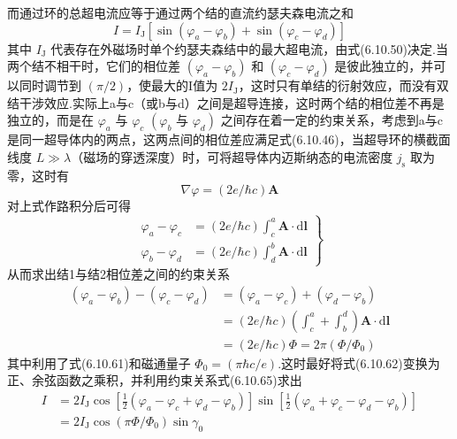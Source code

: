 而通过环的总超电流应等于通过两个结的直流约瑟夫森电流之和
\begin{equation}
  I=I_{\mathrm{J}}\left[\sin\left(\varphi_{a}-\varphi_{b}\right)
  +\sin\left(\varphi_{c}-\varphi_{d}\right)\right]
\end{equation}
其中 $I_{\mathrm{J}}$ 代表存在外磁场时单个约瑟夫森结中的最大超电流，由式(6.10.50)决定.当两个结不相干时，它们的相位差 $\left(\varphi_{a}-\varphi_{b}\right)$ 和
$\left(\varphi_{c}-\varphi_{d}\right)$ 是彼此独立的，并可以同时调节到 $\left(\pi/2\right)$，使最大的I值为 $2I_{\mathrm{J}}$，这时只有单结的衍射效应，而没有双结干涉效应.实际上a与c（或b与d）之间是超导连接，这时两个结的相位差不再是独立的，而是在 $\varphi_{a}$ 与 $\varphi_{c}$ $\left(\varphi_{b}\right.$ 与 $\left.\varphi_{d}\right)$ 之间存在着一定的约束关系，考虑到a与c是同一超导体内的两点，这两点间的相位差应满足式(6.10.46)，当超导环的横截面线度 $L\gg\lambda$（磁场的穿透深度）时，可将超导体内迈斯纳态的电流密度 $j_{\mathrm{s}}$ 取为零，这时有
\begin{equation}
  \nabla\varphi=\left(2e/\hbar c\right)\boldsymbol{A}
\end{equation}
对上式作路积分后可得
\begin{equation}
  \left.
  \begin{aligned}
    \varphi_{a}-\varphi_{c}
    &=\left(2e/\hbar c\right)\int_{c}^{a}\boldsymbol{A}\cdot\mathrm{d}\boldsymbol{l}\\
    \varphi_{b}-\varphi_{d}
    &=\left(2e/\hbar c\right)\int_{d}^{b}\boldsymbol{A}\cdot\mathrm{d}\boldsymbol{l}
  \end{aligned}\right\}
\end{equation}
从而求出结1与结2相位差之间的约束关系
\begin{equation}
\begin{aligned}
  \left(\varphi_{a}-\varphi_{b}\right)-\left(\varphi_{c}-\varphi_{d}\right)
  &=\left(\varphi_{a}-\varphi_{c}\right)+\left(\varphi_{d}-\varphi_{b}\right)\\
  &=\left(2e/\hbar c\right)\left(\int_{c}^{a}+\int_{b}^{d}\right)
  \boldsymbol{A}\cdot\mathrm{d}\boldsymbol{l}\\
  &=\left(2e/\hbar c\right)\Phi=2\pi\left(\Phi/\Phi_{0}\right)
\end{aligned}
\end{equation}
其中利用了式(6.10.61)和磁通量子 $\Phi_{0}=\left(\pi\hbar c/e\right)$.这时最好将式(6.10.62)变换为正、余弦函数之乘积，并利用约束关系式(6.10.65)求出
\begin{equation}
\begin{aligned}
  I&=2I_{\mathrm{J}}\cos\left[\frac{1}{2}
  \left(\varphi_{a}-\varphi_{c}+\varphi_{d}-\varphi_{b}\right)\right]
  \sin\left[\frac{1}{2}
  \left(\varphi_{a}+\varphi_{c}-\varphi_{d}-\varphi_{b}\right)\right]\\
  &=2I_{\mathrm{J}}\cos\left(\pi\Phi/\Phi_{0}\right)\sin\gamma_{0}
\end{aligned}
\end{equation}
